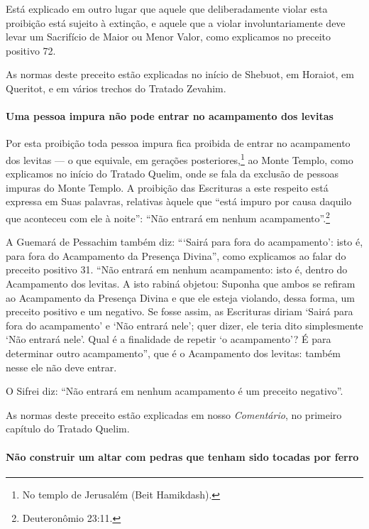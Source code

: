 \begin{multicols}{2}
Está explicado em outro lugar que aquele que deliberadamente violar
esta proibição está sujeito à extinção, e aquele que a violar
involuntariamente deve levar um Sacrifício de Maior ou Menor Valor,
como explicamos no preceito positivo 72.

As normas deste preceito estão explicadas no início de Shebuot\starr, em
Horaiot\starr, em Queritot\starr, e em vários trechos do Tratado Zevahim\starr.

\paragraph{Uma pessoa impura não pode entrar no acampamento dos levitas\starr}

Por esta proibição toda pessoa impura fica proibida de entrar no
acampamento dos levitas\starr{} --- o que equivale, em gerações
posteriores,\footnote{No templo de Jerusalém (Beit Hamikdash).} ao Monte Templo\starr, como explicamos
no início do Tratado Quelim\starr, onde se fala da exclusão de pessoas
impuras do Monte Templo\starr. A proibição das Escrituras a este respeito
está expressa em Suas palavras, relativas àquele que ``está impuro por
causa daquilo que aconteceu com ele à noite'': ``Não entrará em nenhum
acampamento''.\footnote{Deuteronômio 23:11.}

A Guemará\starr{} de Pessachim\starr{} também diz: ```Sairá para fora do acampamento':
isto é, para fora do Acampamento da Presença Divina'', como explicamos
ao falar do preceito positivo 31. ``Não entrará em nenhum acampamento:
isto é, dentro do Acampamento dos levitas\starr. A isto rabiná\starr{} objetou:
Suponha que ambos se refiram ao Acampamento da Presença Divina e que
ele esteja violando, dessa forma, um preceito positivo e um negativo. Se
fosse assim, as Escrituras diriam `Sairá para fora do acampamento' e
`Não entrará nele'; quer dizer, ele teria dito simplesmente `Não entrará
nele'. Qual é a finalidade de repetir `o acampamento'? É para
determinar outro acampamento'', que é o Acampamento dos levitas\starr: também
nesse ele não deve entrar.

O Sifrei\starr{} diz: ``Não entrará em nenhum acampamento é um preceito
negativo''.

As normas deste preceito estão explicadas em nosso \emph{Comentário}, no
primeiro capítulo do Tratado Quelim\starr.

\paragraph{Não construir um altar com pedras que tenham sido tocadas por ferro}


\end{multicols}
